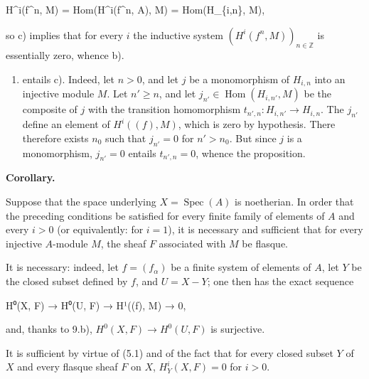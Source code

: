 \documentclass[
  11pt,
  a4paper,
]{book}
\newenvironment{Shaded}{}{}
\newcommand{\NormalTok}[1]{#1}
\providecommand{\tightlist}{%
  \setlength{\itemsep}{0pt}\setlength{\parskip}{0pt}}
\begin{document}
\begin{Shaded}
\begin{Highlighting}[]
\NormalTok{H\^{}i(f\^{}n, M) = Hom(H\^{}i(f\^{}n, A), M) = Hom(H\_\{i,n\}, M),}
\end{Highlighting}
\end{Shaded}

so c) implies that for every \(i\) the inductive system
\((H^{i}(f^{n}, M))_{n \in \mathbb{Z}}\) is essentially zero, whence b).

\begin{enumerate}
\def\labelenumi{\alph{enumi})}
\setcounter{enumi}{1}
\tightlist
\item
  entails c). Indeed, let \(n > 0\), and let \(j\) be a monomorphism of
  \(H_{i,n}\) into an injective module \(M\). Let \(n'
  \geqslant n\), and let \(j_{n'} \in \operatorname{Hom}(H_{i,n'}, M)\)
  be the composite of \(j\) with the transition homomorphism
  \(t_{n',n}: H_{i,n'} \to H_{i,n}\). The \(j_{n'}\) define an element
  of \(H^{i}((f), M)\), which is zero by hypothesis. There therefore
  exists \(n_{0}\) such that \(j_{n'} = 0\) for \(n' > n_{0}\). But
  since \(j\) is a monomorphism, \(j_{n'} = 0\) entails
  \(t_{n',n} = 0\), whence the proposition.
\end{enumerate}

\textbf{Corollary.}

Suppose that the space underlying \(X = \operatorname{Spec}(A)\) is
noetherian. In order that the preceding conditions be satisfied for
every finite family of elements of \(A\) and every \(i > 0\) (or
equivalently: for \(i = 1\)), it is necessary and sufficient that for
every injective \(A\)-module \(M\), the sheaf \(F\) associated with
\(M\) be flasque.

It is necessary: indeed, let \(f = (f_{\alpha})\) be a finite system of
elements of \(A\), let \(Y\) be the closed subset defined by \(f\), and
\(U = X - Y\); one then has the exact sequence

\begin{Shaded}
\begin{Highlighting}[]
\NormalTok{H⁰(X, F) → H⁰(U, F) → H¹((f), M) → 0,}
\end{Highlighting}
\end{Shaded}

and, thanks to 9.b), \(H^{0}(X, F) \to H^{0}(U, F)\) is surjective.

It is sufficient by virtue of (5.1) and of the fact that for every
closed subset \(Y\) of \(X\) and every flasque sheaf \(F\) on \(X\),
\(H^{i}_{Y}(X, F) = 0\) for \(i > 0\).
\end{document}
